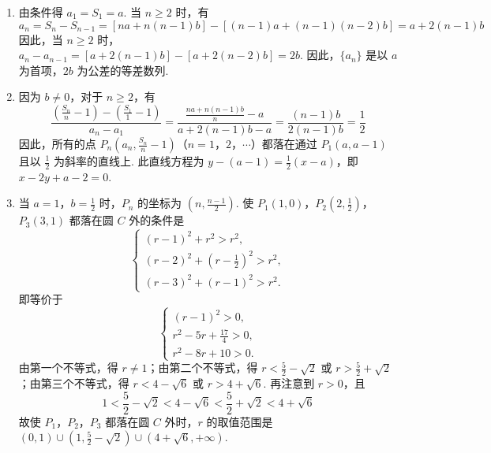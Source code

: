 \begin{solution}
\begin{enumerate}
\item 由条件得 \(a_1 = S_1 = a\). 当 \(n \geqslant 2\) 时，有
\[
a_n = S_n - S_{n - 1} = \left[na + n(n - 1)b\right] - \left[(n - 1)a + (n - 1)(n - 2)b\right] = a + 2(n - 1)b
\]
因此，当 \(n \geqslant 2\) 时，\(a_n - a_{n - 1} = \left[a + 2(n - 1)b\right] - \left[a + 2(n - 2)b\right] = 2b\).
因此，\(\{a_n\}\) 是以 \(a\) 为首项，\(2b\) 为公差的等差数列.

\item 因为 \(b \neq 0\)，对于 \(n \geqslant 2\)，有
\[
\frac{\left(\frac{S_n}{n} - 1\right) - \left(\frac{S_1}{1} - 1\right)}{a_n - a_1}
= \frac{\frac{na + n(n - 1)b}{n} - a}{a + 2(n - 1)b - a}
= \frac{(n - 1)b}{2(n - 1)b}
= \frac{1}{2}
\]
因此，所有的点 \(P_n\left(a_n,\frac{S_n}{n} - 1\right)\)（\(n = 1\)，\(2\)，\(\cdots\)）都落在通过 \(P_1(a,a - 1)\) 且以 \(\frac{1}{2}\) 为斜率的直线上. 此直线方程为 \(y - (a - 1) = \frac{1}{2}(x - a)\)，即 \(x - 2y + a - 2 = 0\).

\item 当 \(a = 1\)，\(b = \frac{1}{2}\) 时，\(P_n\) 的坐标为 \(\left(n,\frac{n - 1}{2}\right)\). 使 \(P_1(1,0)\)，\(P_2\left(2,\frac{1}{2}\right)\)，\(P_3(3,1)\) 都落在圆 \(C\) 外的条件是
\[
\begin{cases}
(r - 1)^2 + r^2 > r^2,\\
(r - 2)^2 + \left(r - \frac{1}{2}\right)^2 > r^2,\\
(r - 3)^2 + (r - 1)^2 > r^2.
\end{cases}
\]
即等价于
\[
\begin{cases}
(r - 1)^2 > 0,\\
r^2 - 5r + \frac{17}{4} > 0,\\
r^2 - 8r + 10 > 0.
\end{cases}
\]
由第一个不等式，得 \(r \neq 1\)；由第二个不等式，得 \(r < \frac{5}{2} - \sqrt{2}\) 或 \(r > \frac{5}{2} + \sqrt{2}\)；由第三个不等式，得 \(r < 4 - \sqrt{6}\) 或 \(r > 4 + \sqrt{6}\). 再注意到 \(r > 0\)，且
\[
1 < \frac{5}{2} - \sqrt{2} < 4 - \sqrt{6} < \frac{5}{2} + \sqrt{2} < 4 + \sqrt{6}
\]
故使 \(P_1\)，\(P_2\)，\(P_3\) 都落在圆 \(C\) 外时，\(r\) 的取值范围是
\((0,1) \cup \left(1,\frac{5}{2} - \sqrt{2}\right) \cup (4 + \sqrt{6}, +\infty)\).
\end{enumerate}
\end{solution}

